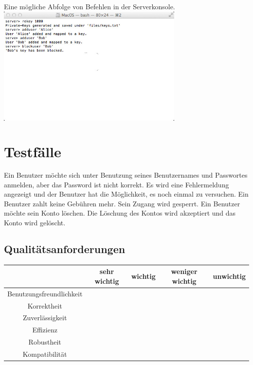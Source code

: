 \documentclass[a4paper,10pt]{scrartcl}
\begin{document}
\begin{illustration}{Eine mögliche Abfolge von Befehlen in der Serverkonsole.}
\includegraphics[width=350px]{figures/images/serverterminal.jpg}
\end{illustration}

\section{Testfälle}

\begin{usecase}
 {Ein Benutzer möchte sich unter Benutzung seines Benutzernames und
                Passwortes anmelden, aber das Password ist nicht korrekt. Es wird eine
                Fehlermeldung angezeigt und der Benutzer hat die Möglichkeit, es noch
                einmal zu versuchen.}
 {Ein Benutzer zahlt keine Gebühren mehr. Sein Zugang wird gesperrt.}
 {Ein Benutzer möchte sein Konto löschen. Die Löschung des Kontos wird 
                akzeptiert und das Konto wird gelöscht.}
\end{usecase}

\subsection{Qualitätsanforderungen}

\begin{tabular}{|c|c|c|c|c|}
\hline
 & \sffamily \textbf{sehr wichtig}
 & \sffamily \textbf{wichtig}
 & \sffamily \textbf{weniger wichtig}
 & \sffamily \textbf{unwichtig} \\
\hline
Benutzungsfreundlichkeit &  &  \X & & \\
\hline
Korrektheit &  \X & & &  \\
\hline
Zuverlässigkeit &  \X & & & \\
\hline
Effizienz &   \X & & & \\
\hline
Robustheit &  & & &\\
\hline
Kompatibilität &  & & & \\
\hline
\end{tabular}
\end{document}
